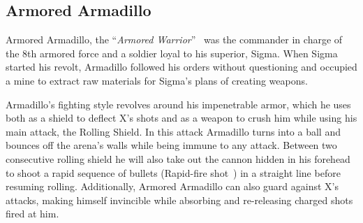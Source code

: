 \subsection{Armored Armadillo}\label{boss:Armored_Armadillo}
Armored Armadillo, the ``\textit{Armored Warrior}''~\cite{book:MMX_Complete_art} was the commander in charge of the 8th armored force and a soldier loyal to his superior, Sigma. When Sigma started his revolt, Armadillo followed his orders without questioning and occupied a mine to extract raw materials for Sigma's plans of creating weapons.

Armadillo's fighting style revolves around his impenetrable armor, which he uses both as a shield to deflect X's shots and as a weapon to crush him while using his main attack, the Rolling Shield. In this attack Armadillo turns into a ball and bounces off the arena's walls while being immune to any attack. Between two consecutive rolling shield he will also take out the cannon hidden in his forehead to shoot a rapid sequence of bullets (Rapid-fire shot~\cite{book:Compendium}) in a straight line before resuming rolling. Additionally, Armored Armadillo can also guard against X's attacks, making himself invincible while absorbing and re-releasing charged shots fired at him.
